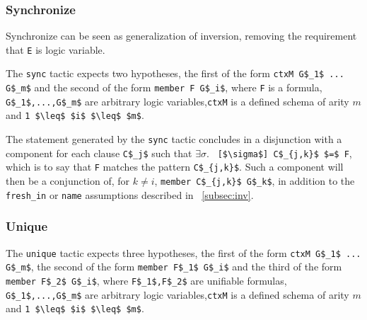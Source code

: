 \documentclass[nocopyrightspace,authoryear]{sigplanconf}
\begin{document}
\subsubsection{Synchronize}
Synchronize can be seen as generalization of inversion, removing the requirement that \lstinline|E| is logic variable. 

The \lstinline|sync| tactic expects two hypotheses, the first of the form \lstinline|ctxM G$_1$ ... G$_m$| and the second of the form \lstinline|member F G$_i$|, where \lstinline|F| is a formula, \lstinline|G$_1$,...,G$_m$| are arbitrary logic variables,\lstinline|ctxM| is a defined schema of arity $m$ and \lstinline|1 $\leq$ $i$ $\leq$ $m$|.

The statement generated by the \lstinline|sync| tactic concludes in a disjunction with a component for each clause \lstinline|C$_j$| such that $\exists \sigma.$ \lstinline| [$\sigma$] C$_{j,k}$ $=$ F|, which is to say that \lstinline|F| matches the pattern \lstinline|C$_{j,k}$|. Such a component will then be a conjunction of, for $k \neq i$, \lstinline|member C$_{j,k}$ G$_k$|, in addition to the \lstinline|fresh_in| or \lstinline|name| assumptions described in ~\ref{subsec:inv}.

\subsubsection{Unique}
The \lstinline|unique| tactic expects three hypotheses, the first of the form \lstinline|ctxM G$_1$ ... G$_m$|, the second of the form \lstinline|member F$_1$ G$_i$| and the third of the form \lstinline|member F$_2$ G$_i$|, where \lstinline|F$_1$,F$_2$| are unifiable formulas, \lstinline|G$_1$,...,G$_m$| are arbitrary logic variables,\lstinline|ctxM| is a defined schema of arity $m$ and \lstinline|1 $\leq$ $i$ $\leq$ $m$|.
\end{document}
